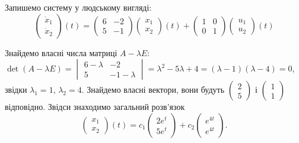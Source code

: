\begin{solution}
    Запишемо систему у людському вигляді:
    \[ \begin{pmatrix} \dot x_1 \\ \dot x_2 \end{pmatrix} (t) = \begin{pmatrix} 6 & -2 \\ 5 & -1 \end{pmatrix} \begin{pmatrix} x_1 \\ x_2 \end{pmatrix} (t) + \begin{pmatrix} 1 & 0 \\ 0 & 1 \end{pmatrix} \begin{pmatrix} u_1 \\ u_2 \end{pmatrix} (t) \]
    
    Знайдемо власні числа матриці $A - \lambda E$: $\det(A - \lambda E) = \begin{vmatrix} 6 - \lambda & -2 \\ 5 & -1 - \lambda \end{vmatrix} = \lambda^2 - 5\lambda + 4 = (\lambda - 1) (\lambda - 4) = 0$, звідки $\lambda_1 = 1$, $\lambda_2 = 4$. Знайдемо власні вектори, вони будуть $\begin{pmatrix} 2 \\ 5 \end{pmatrix}$ і $\begin{pmatrix} 1 \\ 1 \end{pmatrix}$ відповідно. Звідси знаходимо загальний розв'язок
    \[ \begin{pmatrix} x_1 \\ x_2 \end{pmatrix} (t) = c_1 \begin{pmatrix} 2e^t \\ 5e^t \end{pmatrix} + c_2 \begin{pmatrix} e^{4t} \\ e^{4t} \end{pmatrix}. \]
    

\end{solution}
